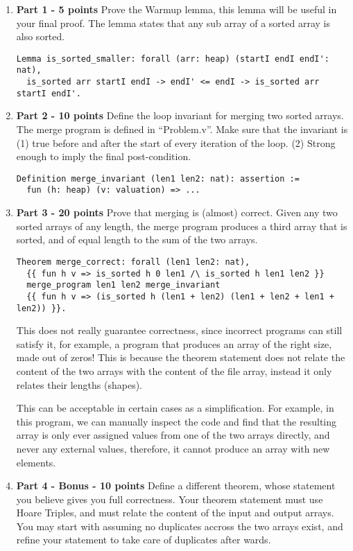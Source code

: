 \documentclass{article}
\begin{document}
\begin{enumerate}
\item \textbf{Part 1 - 5 points} Prove the Warmup lemma, this lemma will be useful in your final proof. The lemma states
that any sub array of a sorted array is also sorted.
\begin{verbatim}
Lemma is_sorted_smaller: forall (arr: heap) (startI endI endI': nat),
  is_sorted arr startI endI -> endI' <= endI -> is_sorted arr startI endI'.
\end{verbatim}

\item \textbf{Part 2 - 10 points} Define the loop invariant for merging two sorted arrays. The merge program is defined in ``Problem.v''.
Make sure that the invariant is (1) true before and after the start of every iteration of the loop. (2) Strong enough to imply the final post-condition.
\begin{verbatim}
Definition merge_invariant (len1 len2: nat): assertion :=
  fun (h: heap) (v: valuation) => ...
\end{verbatim}

\item \textbf{Part 3 - 20 points} Prove that merging is (almost) correct. Given any two sorted arrays of any length, the merge program produces a third array
that is sorted, and of equal length to the sum of the two arrays.
\begin{verbatim}
Theorem merge_correct: forall (len1 len2: nat),
  {{ fun h v => is_sorted h 0 len1 /\ is_sorted h len1 len2 }}
  merge_program len1 len2 merge_invariant
  {{ fun h v => (is_sorted h (len1 + len2) (len1 + len2 + len1 + len2)) }}.
\end{verbatim}

This does not really guarantee correctness, since incorrect programs can still satisfy it, for example, a program that produces an array of the right size, made out
of zeros! This is because the theorem statement does not relate the content of the two arrays with the content of the file array, instead it only relates their
lengths (shapes).

This can be acceptable in certain cases as a simplification. For example, in this program, we can manually inspect the code and find that the resulting array is only
ever assigned values from one of the two arrays directly, and never any external values, therefore, it cannot produce an array with new elements.

\item \textbf{Part 4 - Bonus - 10 points} Define a different theorem, whose statement you believe gives you full correctness. Your theorem statement
must use Hoare Triples, and must relate the content of the input and output arrays. You may start with assuming no duplicates accross the two arrays
exist, and refine your statement to take care of duplicates after wards.


\end{enumerate}
\end{document}
